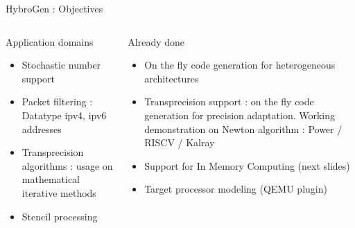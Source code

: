 \begin{Frame}{HybroGen : Objectives}
 \begin{columns}[t]
  \begin{column}{\BW}
    \begin{block}{Application domains}
      \begin{itemize}
      \item Stochastic number support
      \item Packet filtering : Datatype ipv4, ipv6 addresses
      \item Transprecision algorithms : usage on mathematical iterative methods
      \item Stencil processing
      \end{itemize}
    \end{block}
  \end{column}
  \begin{column}{\BW}
    \begin{block}{Already done}
      \begin{itemize}
      \item On the fly code generation for heterogeneous architectures
      \item Transprecision support : on the fly code generation for
        precision adaptation. Working demonstration on Newton algorithm : 
        Power / RISCV / Kalray
        \item Support for In Memory Computing (next slides)
        \item Target processor modeling (QEMU plugin)
      \end{itemize}
    \end{block}
  \end{column}
 \end{columns}
\end{Frame}
